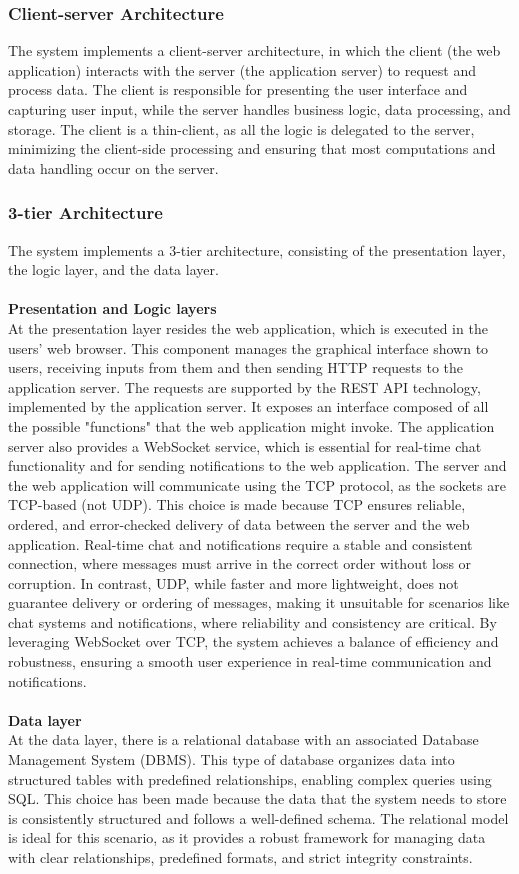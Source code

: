 \subsubsection{Client-server Architecture}
The system implements a client-server architecture, in which the client (the web application) interacts with the server (the application server) to request and process data. The client is responsible for presenting the user interface and capturing user input, while the server handles business logic, data processing, and storage. The client is a thin-client, as all the logic is delegated to the server, minimizing the client-side processing and ensuring that most computations and data handling occur on the server.
\subsubsection{3-tier Architecture}
The system implements a 3-tier architecture, consisting of the presentation layer, the logic layer, and the data layer.\\\\
\noindent
\textbf{Presentation and Logic layers}\\
At the presentation layer resides the web application, which is executed in the users' web browser. This component manages the graphical interface shown to users, receiving inputs from them and then sending HTTP requests to the application server. The requests are supported by the REST API technology, implemented by the application server. It exposes an interface composed of all the possible "functions" that the web application might invoke. The application server also provides a WebSocket service, which is essential for real-time chat functionality and for sending notifications to the web application. The server and the web application will communicate using the TCP protocol, as the sockets are TCP-based (not UDP). This choice is made because TCP ensures reliable, ordered, and error-checked delivery of data between the server and the web application. Real-time chat and notifications require a stable and consistent connection, where messages must arrive in the correct order without loss or corruption. In contrast, UDP, while faster and more lightweight, does not guarantee delivery or ordering of messages, making it unsuitable for scenarios like chat systems and notifications, where reliability and consistency are critical. By leveraging WebSocket over TCP, the system achieves a balance of efficiency and robustness, ensuring a smooth user experience in real-time communication and notifications.\\\\
\noindent
\textbf{Data layer}\\
At the data layer, there is a relational database with an associated Database Management System (DBMS). This type of database organizes data into structured tables with predefined relationships, enabling complex queries using SQL. This choice has been made because the data that the system needs to store is consistently structured and follows a well-defined schema. The relational model is ideal for this scenario, as it provides a robust framework for managing data with clear relationships, predefined formats, and strict integrity constraints.
